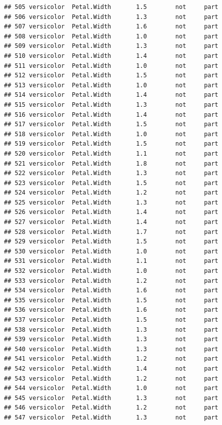 \documentclass[krantz2]{krantz}\usepackage{knitr}%
\begin{document}
\begin{knitrout}
\begin{kframe}
\begin{verbatim}
## 505 versicolor  Petal.Width       1.5        not     part
## 506 versicolor  Petal.Width       1.3        not     part
## 507 versicolor  Petal.Width       1.6        not     part
## 508 versicolor  Petal.Width       1.0        not     part
## 509 versicolor  Petal.Width       1.3        not     part
## 510 versicolor  Petal.Width       1.4        not     part
## 511 versicolor  Petal.Width       1.0        not     part
## 512 versicolor  Petal.Width       1.5        not     part
## 513 versicolor  Petal.Width       1.0        not     part
## 514 versicolor  Petal.Width       1.4        not     part
## 515 versicolor  Petal.Width       1.3        not     part
## 516 versicolor  Petal.Width       1.4        not     part
## 517 versicolor  Petal.Width       1.5        not     part
## 518 versicolor  Petal.Width       1.0        not     part
## 519 versicolor  Petal.Width       1.5        not     part
## 520 versicolor  Petal.Width       1.1        not     part
## 521 versicolor  Petal.Width       1.8        not     part
## 522 versicolor  Petal.Width       1.3        not     part
## 523 versicolor  Petal.Width       1.5        not     part
## 524 versicolor  Petal.Width       1.2        not     part
## 525 versicolor  Petal.Width       1.3        not     part
## 526 versicolor  Petal.Width       1.4        not     part
## 527 versicolor  Petal.Width       1.4        not     part
## 528 versicolor  Petal.Width       1.7        not     part
## 529 versicolor  Petal.Width       1.5        not     part
## 530 versicolor  Petal.Width       1.0        not     part
## 531 versicolor  Petal.Width       1.1        not     part
## 532 versicolor  Petal.Width       1.0        not     part
## 533 versicolor  Petal.Width       1.2        not     part
## 534 versicolor  Petal.Width       1.6        not     part
## 535 versicolor  Petal.Width       1.5        not     part
## 536 versicolor  Petal.Width       1.6        not     part
## 537 versicolor  Petal.Width       1.5        not     part
## 538 versicolor  Petal.Width       1.3        not     part
## 539 versicolor  Petal.Width       1.3        not     part
## 540 versicolor  Petal.Width       1.3        not     part
## 541 versicolor  Petal.Width       1.2        not     part
## 542 versicolor  Petal.Width       1.4        not     part
## 543 versicolor  Petal.Width       1.2        not     part
## 544 versicolor  Petal.Width       1.0        not     part
## 545 versicolor  Petal.Width       1.3        not     part
## 546 versicolor  Petal.Width       1.2        not     part
## 547 versicolor  Petal.Width       1.3        not     part

\end{verbatim}
\end{kframe}
\end{knitrout}
\end{document}
